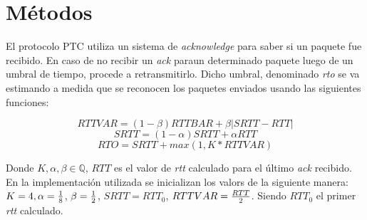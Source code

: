 \section{M\'etodos}
    
    El protocolo PTC utiliza un sistema de \textit{acknowledge} para
    saber si un paquete fue recibido. En caso de no recibir un \textit{ack}
    paraun  determinado paquete luego de un umbral de tiempo, procede a
    retransmitirlo. Dicho umbral, denominado \textit{rto} se va estimando
    a medida que se reconocen los paquetes enviados usando las 
    siguientes funciones: 
    
        $$RTTVAR = (1-\beta)RTTBAR + \beta |SRTT-RTT|$$
        $$SRTT = (1-\alpha)SRTT + \alpha RTT$$
        $$RTO = SRTT + max( 1, K * RTTVAR) $$ 
        
    Donde $K, \alpha, \beta \in \mathbb{Q}$, $RTT$ es el valor de 
    \textit{rtt} calculado para el \'ultimo \textit{ack} recibido. 
    En la implementaci\'on utilizada se inicializan los valors de la
    siguiente manera: $K = 4, \alpha={{1}\over{8}}$,
    $\beta={{1}\over{2}}$, $SRTT={RTT_0}$, $RTTVAR={{RTT}\over{2}}$.
    Siendo $RTT_0$ el primer \textit{rtt} calculado.
    
    
